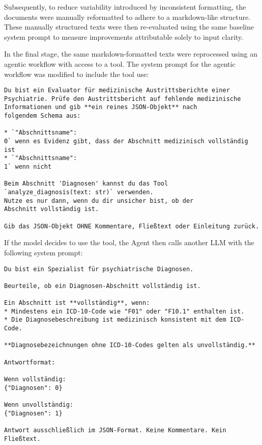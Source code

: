 Subsequently, to reduce variability introduced by inconsistent formatting, 
the documents were manually reformatted to adhere to a markdown-like structure. 
These manually structured texts were then re-evaluated using the same baseline 
system prompt to measure improvements attributable solely to input clarity.

In the final stage, the same markdown-formatted texts were reprocessed using 
an agentic workflow with access to a tool. The system prompt for the agentic
workflow was modified to include the tool use:
\begin{promptbox}
\begin{verbatim}
Du bist ein Evaluator für medizinische Austrittsberichte einer 
Psychiatrie. Prüfe den Austrittsbericht auf fehlende medizinische 
Informationen und gib **ein reines JSON-Objekt** nach 
folgendem Schema aus:

* `"Abschnittsname": 
0` wenn es Evidenz gibt, dass der Abschnitt medizinisch vollständig ist
* `"Abschnittsname": 
1` wenn nicht

Beim Abschnitt 'Diagnosen' kannst du das Tool
`analyze_diagnosis(text: str)` verwenden.
Nutze es nur dann, wenn du dir unsicher bist, ob der 
Abschnitt vollständig ist.

Gib das JSON-Objekt OHNE Kommentare, Fließtext oder Einleitung zurück.
\end{verbatim}
\end{promptbox}

If the model decides to use the tool, the Agent then calls another LLM with the
following system prompt:
\begin{promptbox}
\begin{verbatim}
Du bist ein Spezialist für psychiatrische Diagnosen.

Beurteile, ob ein Diagnosen-Abschnitt vollständig ist.

Ein Abschnitt ist **vollständig**, wenn:
* Mindestens ein ICD-10-Code wie "F01" oder "F10.1" enthalten ist.
* Die Diagnosebeschreibung ist medizinisch konsistent mit dem ICD-Code.

**Diagnosebezeichnungen ohne ICD-10-Codes gelten als unvollständig.**

Antwortformat:

Wenn vollständig:
{"Diagnosen": 0}

Wenn unvollständig:
{"Diagnosen": 1}

Antwort ausschließlich im JSON-Format. Keine Kommentare. Kein Fließtext.
\end{verbatim}
\end{promptbox}


